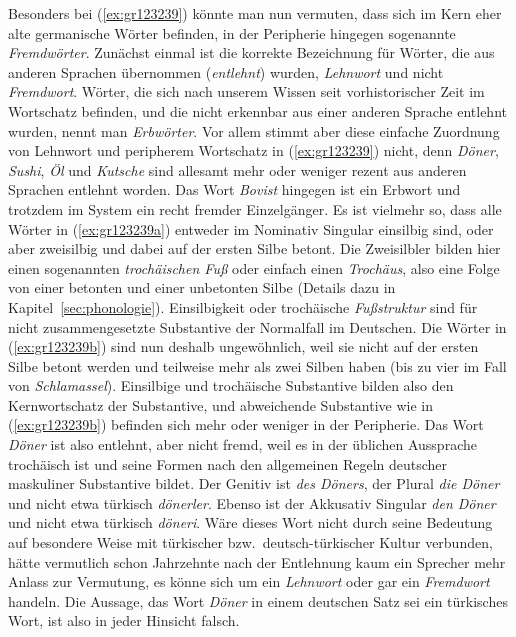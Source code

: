 
Besonders bei (\ref{ex:gr123239}) könnte man nun vermuten, dass sich im Kern eher alte germanische Wörter befinden, in der Peripherie hingegen sogenannte \textit{Fremdwörter}.
Zunächst einmal ist die korrekte Bezeichnung für Wörter, die aus anderen Sprachen übernommen (\textit{entlehnt}) wurden, \textit{Lehnwort} und nicht \textit{Fremdwort}.
Wörter, die sich nach unserem Wissen seit vorhistorischer Zeit im Wortschatz befinden, und die nicht erkennbar aus einer anderen Sprache entlehnt wurden, nennt man \textit{Erbwörter}.
Vor allem stimmt aber diese einfache Zuordnung von Lehnwort und peripherem Wortschatz in (\ref{ex:gr123239}) nicht, denn \textit{Döner}, \textit{Sushi}, \textit{Öl} und \textit{Kutsche} sind allesamt mehr oder weniger rezent aus anderen Sprachen entlehnt worden.
Das Wort \textit{Bovist} hingegen ist ein Erbwort und trotzdem im System ein recht fremder Einzelgänger.
Es ist vielmehr so, dass alle Wörter in (\ref{ex:gr123239a}) entweder im Nominativ Singular einsilbig sind, oder aber zweisilbig und dabei auf der ersten Silbe betont.
Die Zweisilbler bilden hier einen sogenannten \textit{trochäischen Fuß} oder einfach einen \textit{Trochäus}, also eine Folge von einer betonten und einer unbetonten Silbe (Details dazu in Kapitel~\ref{sec:phonologie}).
Einsilbigkeit oder trochäische \textit{Fußstruktur} sind für nicht zusammengesetzte Substantive der Normalfall im Deutschen.
Die Wörter in (\ref{ex:gr123239b}) sind nun deshalb ungewöhnlich, weil sie nicht auf der ersten Silbe betont werden und teilweise mehr als zwei Silben haben (bis zu vier im Fall von \textit{Schlamassel}).
Einsilbige und trochäische Substantive bilden also den Kernwortschatz der Substantive, und abweichende Substantive wie in (\ref{ex:gr123239b}) befinden sich mehr oder weniger in der Peripherie.
Das Wort \textit{Döner} ist also entlehnt, aber nicht fremd, weil es in der üblichen Aussprache trochäisch ist und seine Formen nach den allgemeinen Regeln deutscher maskuliner Substantive bildet.
Der Genitiv ist \textit{des Döners}, der Plural \textit{die Döner} und nicht etwa türkisch \textit{dönerler}.
Ebenso ist der Akkusativ Singular \textit{den Döner} und nicht etwa türkisch \textit{döneri}.
Wäre dieses Wort nicht durch seine Bedeutung auf besondere Weise mit türkischer bzw.\ deutsch-türkischer Kultur verbunden, hätte vermutlich schon Jahrzehnte nach der Entlehnung kaum ein Sprecher mehr Anlass zur Vermutung, es könne sich um ein \textit{Lehnwort} oder gar ein \textit{Fremdwort} handeln.
Die Aussage, das Wort \textit{Döner} in einem deutschen Satz sei ein türkisches Wort, ist also in jeder Hinsicht falsch.

